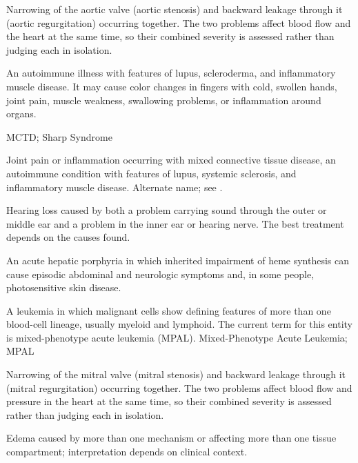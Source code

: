  Narrowing of the aortic valve (aortic stenosis) and backward leakage through it (aortic regurgitation) occurring together. The two problems affect blood flow and the heart at the same time, so their combined severity is assessed rather than judging each in isolation.

 An autoimmune illness with features of lupus, scleroderma, and inflammatory muscle disease. It may cause color changes in fingers with cold, swollen hands, joint pain, muscle weakness, swallowing problems, or inflammation around organs.

\synonyms
MCTD; Sharp Syndrome

 Joint pain or inflammation occurring with mixed connective tissue disease, an autoimmune condition with features of lupus, systemic sclerosis, and inflammatory muscle disease.
 Alternate name; see .

 Hearing loss caused by both a problem carrying sound through the outer or middle ear and a problem in the inner ear or hearing nerve. The best treatment depends on the causes found.

 An acute hepatic porphyria in which inherited impairment of heme synthesis can cause episodic abdominal and neurologic symptoms and, in some people, photosensitive skin disease.

 A leukemia in which malignant cells show defining features of more than one blood-cell lineage, usually myeloid and lymphoid. The current term for this entity is mixed-phenotype acute leukemia (MPAL).
\synonyms
Mixed-Phenotype Acute Leukemia; MPAL

 Narrowing of the mitral valve (mitral stenosis) and backward leakage through it (mitral regurgitation) occurring together. The two problems affect blood flow and pressure in the heart at the same time, so their combined severity is assessed rather than judging each in isolation.

 Edema caused by more than one mechanism or affecting more than one tissue compartment; interpretation depends on clinical context.


